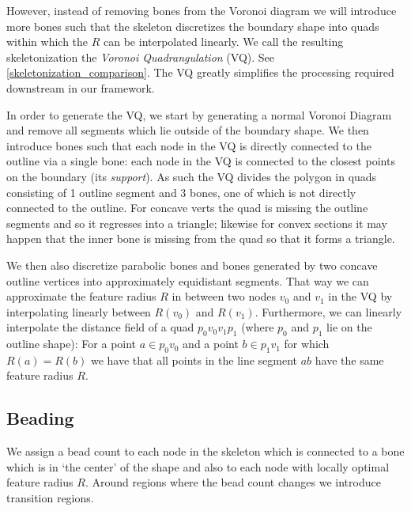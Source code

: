 However, instead of removing bones from the Voronoi diagram we will introduce more bones such that the skeleton discretizes the boundary shape into quads within which the $R$ can be interpolated linearly.
We call the resulting skeletonization the \emph{Voronoi Quadrangulation} (VQ).
See \cref{skeletonization_comparison}.
The VQ greatly simplifies the processing required downstream in our framework.

In order to generate the VQ, we start by generating a normal Voronoi Diagram and remove all segments which lie outside of the boundary shape.
We then introduce bones such that each node in the VQ is directly connected to the outline via a single bone:
each node in the VQ is connected to the closest points on the boundary (its \emph{support}).
As such the VQ divides the polygon in quads consisting of 1 outline segment and 3 bones, one of which is not directly connected to the outline.
For concave verts the quad is missing the outline segments and so it regresses into a triangle;
likewise for convex sections it may happen that the inner bone is missing from the quad so that it forms a triangle.

We then also discretize parabolic bones and bones generated by two concave outline vertices into approximately equidistant segments.
That way we can approximate the feature radius $R$ in between two nodes $v_0$ and $v_1$ in the VQ by interpolating linearly between $R(v_0)$ and $R(v_1)$.
Furthermore, we can linearly interpolate the distance field of a quad $p_0v_0v_1p_1$ (where $p_0$ and $p_1$ lie on the outline shape):
For a point $a \in p_0v_0$ and a point $b \in p_1v_1$ for which $R(a) = R(b)$ we have that all points in the line segment $ab$ have the same feature radius $R$.



\subsection{Beading}
We assign a bead count to each node in the skeleton which is connected to a bone which is in `the center' of the shape
and also to each node with locally optimal feature radius $R$.
Around regions where the bead count changes we introduce transition regions.


